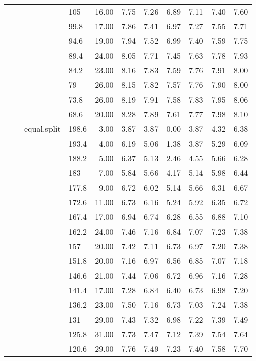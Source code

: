 \begin{longtable}{llllrrrrrrr}
   &  &  & 105 & 16.00 & 7.75 & 7.26 & 6.89 & 7.11 & 7.40 & 7.60 \\ 
   &  &  & 99.8 & 17.00 & 7.86 & 7.41 & 6.97 & 7.27 & 7.55 & 7.71 \\ 
   &  &  & 94.6 & 19.00 & 7.94 & 7.52 & 6.99 & 7.40 & 7.59 & 7.75 \\ 
   &  &  & 89.4 & 24.00 & 8.05 & 7.71 & 7.45 & 7.63 & 7.78 & 7.93 \\ 
   &  &  & 84.2 & 23.00 & 8.16 & 7.83 & 7.59 & 7.76 & 7.91 & 8.00 \\ 
   &  &  & 79 & 26.00 & 8.15 & 7.82 & 7.57 & 7.76 & 7.90 & 8.00 \\ 
   &  &  & 73.8 & 26.00 & 8.19 & 7.91 & 7.58 & 7.83 & 7.95 & 8.06 \\ 
   &  &  & 68.6 & 20.00 & 8.28 & 7.89 & 7.61 & 7.77 & 7.98 & 8.10 \\ 
   &  & equal.split & 198.6 & 3.00 & 3.87 & 3.87 & 0.00 & 3.87 & 4.32 & 6.38 \\ 
   &  &  & 193.4 & 4.00 & 6.19 & 5.06 & 1.38 & 3.87 & 5.29 & 6.09 \\ 
   &  &  & 188.2 & 5.00 & 6.37 & 5.13 & 2.46 & 4.55 & 5.66 & 6.28 \\ 
   &  &  & 183 & 7.00 & 5.84 & 5.66 & 4.17 & 5.14 & 5.98 & 6.44 \\ 
   &  &  & 177.8 & 9.00 & 6.72 & 6.02 & 5.14 & 5.66 & 6.31 & 6.67 \\ 
   &  &  & 172.6 & 11.00 & 6.73 & 6.16 & 5.24 & 5.92 & 6.35 & 6.72 \\ 
   &  &  & 167.4 & 17.00 & 6.94 & 6.74 & 6.28 & 6.55 & 6.88 & 7.10 \\ 
   &  &  & 162.2 & 24.00 & 7.46 & 7.16 & 6.84 & 7.07 & 7.23 & 7.38 \\ 
   &  &  & 157 & 20.00 & 7.42 & 7.11 & 6.73 & 6.97 & 7.20 & 7.38 \\ 
   &  &  & 151.8 & 20.00 & 7.16 & 6.97 & 6.56 & 6.85 & 7.07 & 7.18 \\ 
   &  &  & 146.6 & 21.00 & 7.44 & 7.06 & 6.72 & 6.96 & 7.16 & 7.28 \\ 
   &  &  & 141.4 & 17.00 & 7.28 & 6.84 & 6.40 & 6.73 & 6.98 & 7.20 \\ 
   &  &  & 136.2 & 23.00 & 7.50 & 7.16 & 6.73 & 7.03 & 7.24 & 7.38 \\ 
   &  &  & 131 & 29.00 & 7.43 & 7.32 & 6.98 & 7.22 & 7.39 & 7.49 \\ 
   &  &  & 125.8 & 31.00 & 7.73 & 7.47 & 7.12 & 7.39 & 7.54 & 7.64 \\ 
   &  &  & 120.6 & 29.00 & 7.76 & 7.49 & 7.23 & 7.40 & 7.58 & 7.70 \\ 

\end{longtable}
